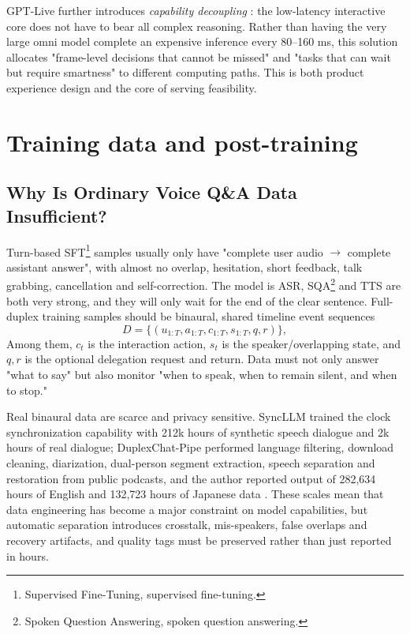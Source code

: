 \documentclass[UTF8,fontset=none,a4paper,10pt]{ctexart}
\begin{document}
GPT-Live further introduces \emph{ capability decoupling }: the low-latency interactive core does not have to bear all complex reasoning. Rather than having the very large omni model complete an expensive inference every 80--160 ms, this solution allocates "frame-level decisions that cannot be missed" and "tasks that can wait but require smartness" to different computing paths. This is both product experience design and the core of serving feasibility.

\section{Training data and post-training}

\subsection{Why Is Ordinary Voice Q\&A Data Insufficient?}

Turn-based SFT\footnote{Supervised Fine-Tuning, supervised fine-tuning. } samples usually only have "complete user audio $\to$ complete assistant answer", with almost no overlap, hesitation, short feedback, talk grabbing, cancellation and self-correction. The model is ASR, SQA\footnote{Spoken Question Answering, spoken question answering. } and TTS are both very strong, and they will only wait for the end of the clear sentence. Full-duplex training samples should be binaural, shared timeline event sequences
\begin{equation}
D=\{(u_{1:T},a_{1:T},c_{1:T},s_{1:T},q,r)\},
\end{equation}
Among them, $c_t$ is the interaction action, $s_t$ is the speaker/overlapping state, and $q,r$ is the optional delegation request and return. Data must not only answer "what to say" but also monitor "when to speak, when to remain silent, and when to stop."

Real binaural data are scarce and privacy sensitive. SyncLLM trained the clock synchronization capability \cite{en:veluri2024syncllm} with 212k hours of synthetic speech dialogue and 2k hours of real dialogue; DuplexChat-Pipe performed language filtering, download cleaning, diarization, dual-person segment extraction, speech separation and restoration from public podcasts, and the author reported output of 282,634 hours of English and 132,723 hours of Japanese data \cite{en:nakata2026duplexchat}. These scales mean that data engineering has become a major constraint on model capabilities, but automatic separation introduces crosstalk, mis-speakers, false overlaps and recovery artifacts, and quality tags must be preserved rather than just reported in hours.
\end{document}
